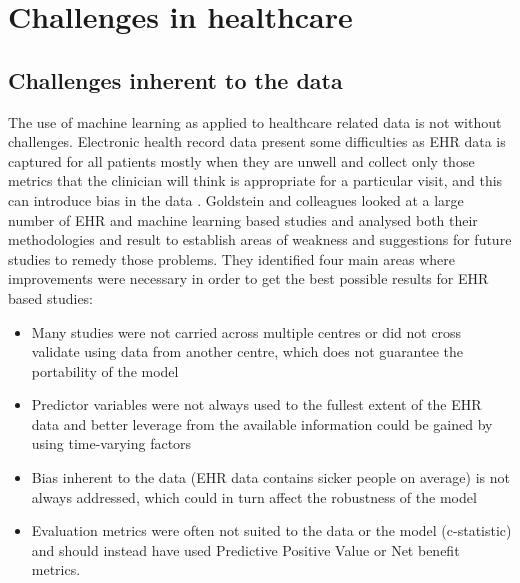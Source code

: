 \section{Challenges in healthcare}
\subsection{Challenges inherent to the data}
The use of machine learning as applied to healthcare related data is not without challenges. 
Electronic health record data present some difficulties as EHR data is captured for all patients mostly when they are unwell and collect only those metrics that the clinician will think is appropriate for a particular visit, and this can introduce bias in the data \citep{Hersh:2013gp, Goldstein:2017bk}. \newline 
Goldstein and colleagues looked at a large number of EHR and machine learning based studies and analysed both their methodologies and result to  establish areas of weakness and suggestions for future studies to remedy those problems. They identified four main areas where improvements were necessary in order to get the best possible results for EHR based studies: 
\begin{itemize}
    \item Many studies were not carried across multiple centres or did not cross validate using data from another centre, which does not guarantee the portability of the model 
    \item Predictor variables were not always used to the fullest extent of the EHR data and better leverage from the available information could be gained by using time-varying factors
    \item Bias inherent to the data (EHR data contains sicker people on average) is not always addressed, which could in turn affect the robustness of the model
    \item Evaluation metrics were often not suited to the data or the model (c-statistic) and should instead have used Predictive Positive Value or Net benefit metrics. 
\end{itemize}

